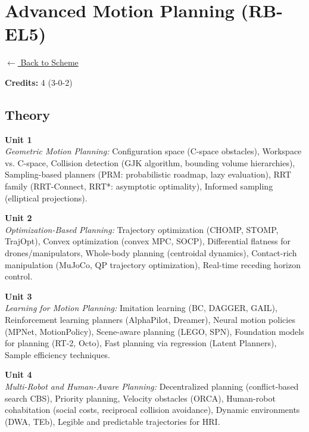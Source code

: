 \section*{Advanced Motion Planning (RB-EL5)}
\label{elec:RB_5}

\noindent \small{\hyperref[main:scheme]{$\leftarrow$ Back to Scheme}} \vspace{0.5cm}

\noindent \textbf{Credits:} 4 (3-0-2)

\subsection*{Theory}
\noindent\textbf{Unit 1} \\
\textit{Geometric Motion Planning:} Configuration space (C-space obstacles), Workspace vs. C-space, Collision detection (GJK algorithm, bounding volume hierarchies), Sampling-based planners (PRM: probabilistic roadmap, lazy evaluation), RRT family (RRT-Connect, RRT*: asymptotic optimality), Informed sampling (elliptical projections).

\vspace{0.3cm}

\noindent\textbf{Unit 2} \\
\textit{Optimization-Based Planning:} Trajectory optimization (CHOMP, STOMP, TrajOpt), Convex optimization (convex MPC, SOCP), Differential flatness for drones/manipulators, Whole-body planning (centroidal dynamics), Contact-rich manipulation (MuJoCo, QP trajectory optimization), Real-time receding horizon control.

\vspace{0.3cm}

\noindent\textbf{Unit 3} \\
\textit{Learning for Motion Planning:} Imitation learning (BC, DAGGER, GAIL), Reinforcement learning planners (AlphaPilot, Dreamer), Neural motion policies (MPNet, MotionPolicy), Scene-aware planning (LEGO, SPN), Foundation models for planning (RT-2, Octo), Fast planning via regression (Latent Planners), Sample efficiency techniques.

\vspace{0.3cm}

\noindent\textbf{Unit 4} \\
\textit{Multi-Robot and Human-Aware Planning:} Decentralized planning (conflict-based search CBS), Priority planning, Velocity obstacles (ORCA), Human-robot cohabitation (social costs, reciprocal collision avoidance), Dynamic environments (DWA, TEb), Legible and predictable trajectories for HRI.

